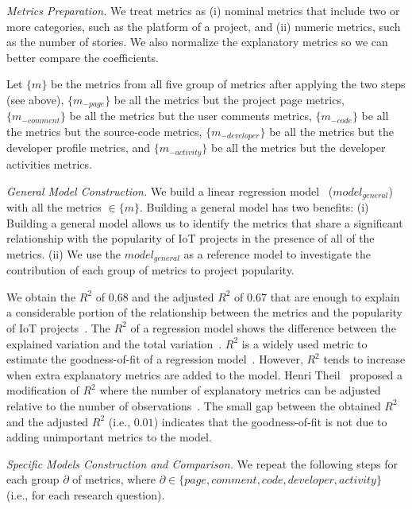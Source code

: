 \noindent\textit{Metrics Preparation.} We treat metrics as (i) nominal metrics
that include two or more categories, such as the platform of a project, and
(ii) numeric metrics, such as the number of stories. We also normalize the
explanatory metrics so we can better compare the coefficients.

Let $\{m\}$ be the metrics from all five group of metrics after applying the
two steps (see above), $\{m_{-page}\}$ be all the metrics but the project page
metrics, $\{m_{-comment}\}$ be all the metrics but the user comments metrics,
$\{m_{-code}\}$ be all the metrics but the source-code metrics,
$\{m_{-developer}\}$ be all the metrics but the developer profile metrics, and
$\{m_{-activity}\}$ be all the metrics but the developer activities metrics.

\vspace{0.1cm}

\noindent\textit{General Model Construction.} We build a linear regression
model~\cite{weisberg2005applied,lrm} ($model_{general}$) with all the metrics
$\in\{m\}$. Building a general model has two benefits: (i) Building a general
model allows us to identify the metrics that share a significant relationship
with the popularity of IoT projects in the presence of all of the metrics. (ii)
We use the $model_{general}$ as a reference model to investigate the
contribution of each group of metrics to project popularity.

We obtain the $R^2$ of $0.68$ and the adjusted $R^2$ of $0.67$ that are enough
to explain a considerable portion of the relationship between the metrics and
the popularity of IoT
projects~\cite{glantz1990primer,steel1960torrie,draper1998applied}.  The $R^2$
of a regression model shows the difference between the explained variation and
the total variation~\cite{glantz1990primer}.  $R^2$ is a widely used metric to
estimate the goodness-of-fit of a regression
model~\cite{box1978statistics,kitchenham2002preliminary}. However, $R^2$ tends
to increase when extra explanatory metrics are added to the model.  Henri
Theil~\cite{theil1971applied} proposed a modification of $R^2$ where the number
of explanatory metrics can be adjusted relative to the number of
observations~\cite{theil1971applied}. The small gap between the obtained $R^2$
and the adjusted $R^2$ (i.e., $0.01$) indicates that the goodness-of-fit is not
due to adding unimportant metrics to the model. 

\vspace{0.1cm}

\noindent\textit{Specific Models Construction and Comparison.}
We repeat the following steps for each group $\partial$ of metrics, where
$\partial\in\{page,comment,code,developer,activity\}$ (i.e., for each research
question).

